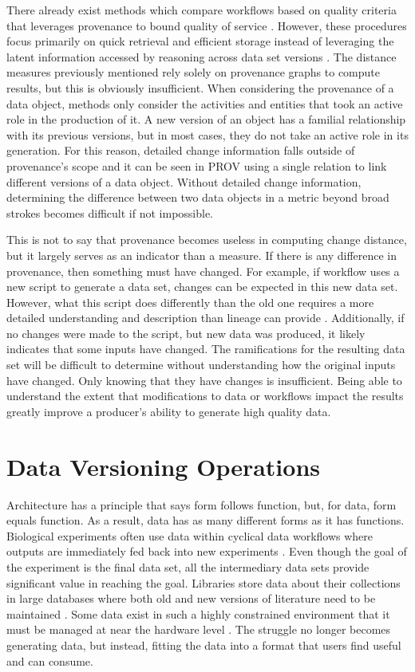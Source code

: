 There already exist methods which compare workflows based on quality criteria that leverages provenance to bound quality of service \cite{2015:CAA:2778374.2778504}.
However, these procedures focus primarily on quick retrieval and efficient storage instead of leveraging the latent information accessed by reasoning across data set versions \cite{tan2004research}.
The distance measures previously mentioned rely solely on provenance graphs to compute results, but this is obviously insufficient.
When considering the provenance of a data object, methods only consider the activities and entities that took an active role in the production of it.
A new version of an object has a familial relationship with its previous versions, but in most cases, they do not take an active role in its generation.
For this reason, detailed change information falls outside of provenance's scope and it can be seen in PROV using a single relation to link different versions of a data object.
Without detailed change information, determining the difference between two data objects in a metric beyond broad strokes becomes difficult if not impossible.

This is not to say that provenance becomes useless in computing change distance, but it largely serves as an indicator than a measure.
If there is any difference in provenance, then something must have changed.
For example, if workflow uses a new script to generate a data set, changes can be expected in this new data set.
However, what this script does differently than the old one requires a more detailed understanding and description than lineage can provide  \cite{Bose:2005:LRS:1057977.1057978}.
Additionally, if no changes were made to the script, but new data was produced, it likely indicates that some inputs have changed.
The ramifications for the resulting data set will be difficult to determine without understanding how the original inputs have changed.
Only knowing that they have changes is insufficient.
Being able to understand the extent that modifications to data or workflows impact the results greatly improve a producer's ability to generate high quality data.

\section{Data Versioning Operations}

Architecture has a principle that says form follows function, but, for data, form equals function.
As a result, data has as many different forms as it has functions.
Biological experiments often use data within cyclical data workflows where outputs are immediately fed back into new experiments \cite{Tagger2005}.
Even though the goal of the experiment is the final data set, all the intermediary data sets provide significant value in reaching the goal.
Libraries store data about their collections in large databases where both old and new versions of literature need to be maintained \cite{Wiil:2000:RDH:338407.338517}.
Some data exist in such a highly constrained environment that it must be managed at near the hardware level \cite{Flouris04clotho:transparent}.
The struggle no longer becomes generating data, but instead, fitting the data into a format that users find useful and can consume.

